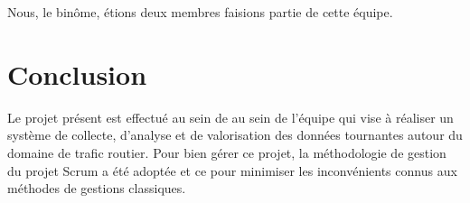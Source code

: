 Nous, le binôme, étions deux membres faisions partie de cette équipe.

\section*{Conclusion}

Le projet présent est effectué au sein de  au sein
de l'équipe  qui vise à réaliser un système de collecte,
d'analyse et de valorisation des données tournantes autour du domaine de trafic
routier. Pour bien gérer ce projet, la méthodologie de gestion du projet Scrum
a été adoptée et ce pour minimiser les inconvénients connus aux méthodes de
gestions classiques.

%
%
%
%
%
%
